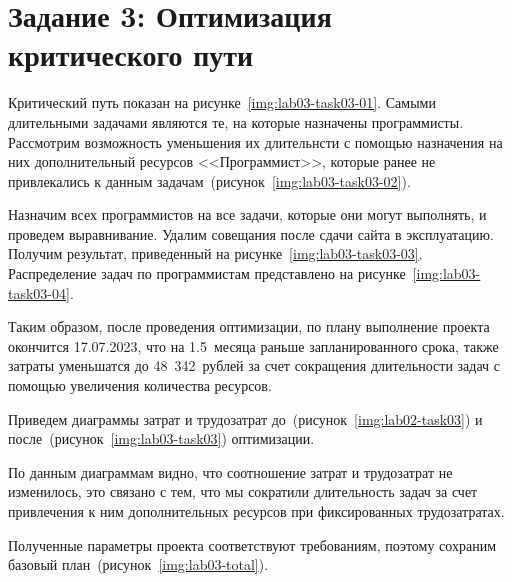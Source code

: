\section{Задание 3: Оптимизация критического пути }

Критический путь показан на рисунке~\ref{img:lab03-task03-01}. Самыми
длительными задачами являются те, на которые назначены программисты. Рассмотрим
возможность уменьшения их длительнсти с помощью назначения на них
дополнительный ресурсов <<Программист>>, которые ранее не привлекались к данным
задачам~(рисунок~\ref{img:lab03-task03-02}).



Назначим всех программистов на все задачи, которые они могут выполнять, и
проведем выравнивание. Удалим совещания после сдачи сайта в эксплуатацию.
Получим результат, приведенный на рисунке~\ref{img:lab03-task03-03}.
Распределение задач по программистам представлено на
рисунке~\ref{img:lab03-task03-04}.



Таким образом, после проведения оптимизации, по плану выполнение проекта
окончится 17.07.2023, что на 1.5~месяца раньше запланированного срока, также
затраты уменьшатся до 48~342~рублей за счет сокращения длительности задач с
помощью увеличения количества ресурсов.

Приведем диаграммы затрат и трудозатрат до~(рисунок~\ref{img:lab02-task03})
и после~(рисунок~\ref{img:lab03-task03}) оптимизации.



По данным диаграммам видно, что соотношение затрат и трудозатрат не изменилось,
это связано с тем, что мы сократили длительность задач за счет привлечения к
ним дополнительных ресурсов при фиксированных трудозатратах.

Полученные параметры проекта соответствуют требованиям, поэтому сохраним
базовый план~(рисунок~\ref{img:lab03-total}).

